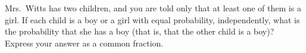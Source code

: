 Mrs.\ Witts has two children, and you are told only that at least one of them is a girl. If each child is a boy or a girl with equal probability, independently, what is the probability that she has a boy (that is, that the other child is a boy)? Express your answer as a common fraction.
